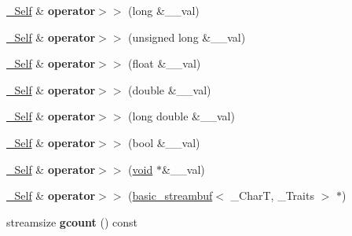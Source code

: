 \begin{DoxyCompactItemize}
\item 
\mbox{\label{classbasic__istream_ab49fed6a59724a60c92571cee58904ee}} 
\hyperlink{classbasic__istream}{\+\_\+\+Self} \& {\bfseries operator$>$$>$} (long \&\+\_\+\+\_\+val)
\item 
\mbox{\label{classbasic__istream_a55bba8a0debc2bbb8436fa2cb0e554b6}} 
\hyperlink{classbasic__istream}{\+\_\+\+Self} \& {\bfseries operator$>$$>$} (unsigned long \&\+\_\+\+\_\+val)
\item 
\mbox{\label{classbasic__istream_a6209635fd0ca83c081703fde4a0830fe}} 
\hyperlink{classbasic__istream}{\+\_\+\+Self} \& {\bfseries operator$>$$>$} (float \&\+\_\+\+\_\+val)
\item 
\mbox{\label{classbasic__istream_a666c8f86c67f4162c8ac9797000eb21d}} 
\hyperlink{classbasic__istream}{\+\_\+\+Self} \& {\bfseries operator$>$$>$} (double \&\+\_\+\+\_\+val)
\item 
\mbox{\label{classbasic__istream_afe4980b60cbcf3f3b35462d9498ae8d8}} 
\hyperlink{classbasic__istream}{\+\_\+\+Self} \& {\bfseries operator$>$$>$} (long double \&\+\_\+\+\_\+val)
\item 
\mbox{\label{classbasic__istream_ad194d2782922ce646144fd9a35dccc49}} 
\hyperlink{classbasic__istream}{\+\_\+\+Self} \& {\bfseries operator$>$$>$} (bool \&\+\_\+\+\_\+val)
\item 
\mbox{\label{classbasic__istream_a45c46a89e74cf694a9c0efd79b8e2c87}} 
\hyperlink{classbasic__istream}{\+\_\+\+Self} \& {\bfseries operator$>$$>$} (\hyperlink{interfacevoid}{void} $\ast$\&\+\_\+\+\_\+val)
\item 
\mbox{\label{classbasic__istream_ad94a59781d91180b6d77797e47096863}} 
\hyperlink{classbasic__istream}{\+\_\+\+Self} \& {\bfseries operator$>$$>$} (\hyperlink{classbasic__streambuf}{basic\+\_\+streambuf}$<$ \+\_\+\+CharT, \+\_\+\+Traits $>$ $\ast$)
\item 
\mbox{\label{classbasic__istream_aa6b4e8778ba75092b992002001d4c62c}} 
streamsize {\bfseries gcount} () const

\end{DoxyCompactItemize}

